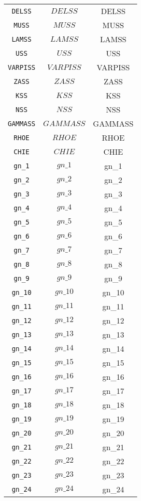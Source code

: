 \begin{center}
\begin{longtable}{ccc}
\texttt{DELSS} & $DELSS$ & DELSS\\
\texttt{MUSS} & $MUSS$ & MUSS\\
\texttt{LAMSS} & $LAMSS$ & LAMSS\\
\texttt{USS} & $USS$ & USS\\
\texttt{VARPISS} & $VARPISS$ & VARPISS\\
\texttt{ZASS} & $ZASS$ & ZASS\\
\texttt{KSS} & $KSS$ & KSS\\
\texttt{NSS} & $NSS$ & NSS\\
\texttt{GAMMASS} & $GAMMASS$ & GAMMASS\\
\texttt{RHOE} & $RHOE$ & RHOE\\
\texttt{CHIE} & $CHIE$ & CHIE\\
\texttt{gn\_1} & $gn\_1$ & gn\_1\\
\texttt{gn\_2} & $gn\_2$ & gn\_2\\
\texttt{gn\_3} & $gn\_3$ & gn\_3\\
\texttt{gn\_4} & $gn\_4$ & gn\_4\\
\texttt{gn\_5} & $gn\_5$ & gn\_5\\
\texttt{gn\_6} & $gn\_6$ & gn\_6\\
\texttt{gn\_7} & $gn\_7$ & gn\_7\\
\texttt{gn\_8} & $gn\_8$ & gn\_8\\
\texttt{gn\_9} & $gn\_9$ & gn\_9\\
\texttt{gn\_10} & $gn\_10$ & gn\_10\\
\texttt{gn\_11} & $gn\_11$ & gn\_11\\
\texttt{gn\_12} & $gn\_12$ & gn\_12\\
\texttt{gn\_13} & $gn\_13$ & gn\_13\\
\texttt{gn\_14} & $gn\_14$ & gn\_14\\
\texttt{gn\_15} & $gn\_15$ & gn\_15\\
\texttt{gn\_16} & $gn\_16$ & gn\_16\\
\texttt{gn\_17} & $gn\_17$ & gn\_17\\
\texttt{gn\_18} & $gn\_18$ & gn\_18\\
\texttt{gn\_19} & $gn\_19$ & gn\_19\\
\texttt{gn\_20} & $gn\_20$ & gn\_20\\
\texttt{gn\_21} & $gn\_21$ & gn\_21\\
\texttt{gn\_22} & $gn\_22$ & gn\_22\\
\texttt{gn\_23} & $gn\_23$ & gn\_23\\
\texttt{gn\_24} & $gn\_24$ & gn\_24\\

\end{longtable}
\end{center}
